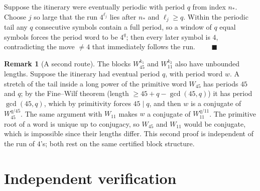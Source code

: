 \documentclass[11pt,a4paper]{article}
\theoremstyle{definition}
\newtheorem{remark}[theorem]{Remark}
\newcommand{\Wa}{W_{45}}
\newcommand{\Wb}{W_{11}}
\begin{document}
Suppose the itinerary were eventually periodic with period $q$ from index $n_*$. Choose $j$ so large that the run $4^{\ell_j}$ lies after $n_*$ and $\ell_j\ge q$. Within the periodic tail any $q$ consecutive symbols contain a full period, so a window of $q$ equal symbols forces the period word to be $4^q$; then every later symbol is $4$, contradicting the move $\ne 4$ that immediately follows the run. $\qquad\blacksquare$

\begin{remark}[A second route]
The blocks $\Wa^{k_1}$ and $\Wb^{k_2}$ also have unbounded lengths. Suppose the itinerary had eventual period $q$, with period word $w$. A stretch of the tail inside a long power of the primitive word $\Wa$ has periods $45$ and $q$; by the Fine--Wilf theorem \cite{finewilf} (length $\ge 45+q-\gcd(45,q)$) it has period $\gcd(45,q)$, which by primitivity forces $45\mid q$, and then $w$ is a conjugate of $\Wa^{q/45}$. The same argument with $\Wb$ makes $w$ a conjugate of $\Wb^{q/11}$. The primitive root of a word is unique up to conjugacy, so $\Wa$ and $\Wb$ would be conjugate, which is impossible since their lengths differ. This second proof is independent of the run of $4$'s; both rest on the same certified block structure.
\end{remark}

\section{Independent verification}\label{sec:audit}
\end{document}
